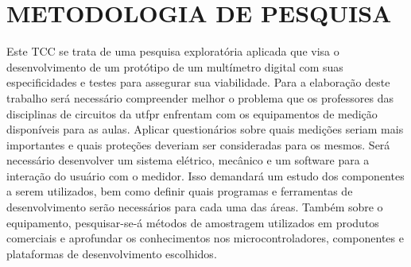 \section{METODOLOGIA DE PESQUISA}\label{sec:metodologiapesq}
Este \gls{TCC} se trata de uma pesquisa exploratória aplicada que visa o desenvolvimento de um protótipo de um multímetro digital com suas especificidades e testes para assegurar sua viabilidade. 
Para a elaboração deste trabalho será necessário compreender melhor o problema que os professores das disciplinas de circuitos da \gls{utfpr} enfrentam com os equipamentos de medição disponíveis para as aulas. Aplicar questionários sobre quais medições seriam mais importantes e quais proteções deveriam ser consideradas para os mesmos.
Será necessário desenvolver um sistema elétrico, mecânico e um software para a interação do usuário com o medidor. Isso demandará um estudo dos componentes a serem utilizados, bem como definir quais programas e ferramentas de desenvolvimento serão necessários para cada uma das áreas.
Também sobre o equipamento, pesquisar-se-á métodos de amostragem utilizados em produtos comerciais e aprofundar os conhecimentos nos microcontroladores, componentes e plataformas de desenvolvimento escolhidos.
